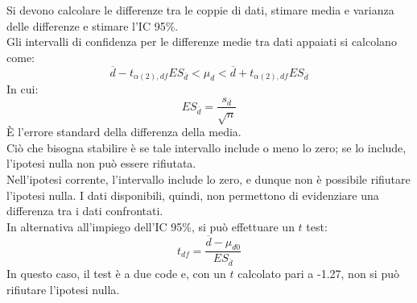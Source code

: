 \documentclass[10pt, draft]{book}
\newcounter{example}[section]
\begin{document}
\begin{example}
\begin{figure}[H]
        \caption{\small{}}
    \end{figure}
    Si devono calcolare le differenze tra le coppie di dati, stimare media e varianza delle differenze e stimare l'IC 95\%.
    \\
    Gli intervalli di confidenza per le differenze medie tra dati appaiati si calcolano come:
    \begin{equation}
        \overline{d}-t_{\alpha(2),df}ES_{\overline{d}}<\mu_d<\overline{d}+t_{\alpha(2),df}ES_{\overline{d}}
    \end{equation}
    In cui:
    \begin{equation}
        ES_{\overline{d}} = \frac{s_{\overline{d}}}{\sqrt{n}}
    \end{equation}
    È l'errore standard della differenza della media.
    \\
    Ciò che bisogna stabilire è se tale intervallo include o meno lo zero; se lo include, l'ipotesi nulla non può essere rifiutata.
    \\
    Nell'ipotesi corrente, l'intervallo include lo zero, e dunque non è possibile rifiutare l'ipotesi nulla. I dati disponibili, quindi, non permettono di evidenziare una differenza tra i dati confrontati.
    \\
    In alternativa all'impiego dell'IC 95\%, si può effettuare un $t$ test:
    \begin{equation}
        t_{df} = \frac{\overline{d}-\mu_{d0}}{ES_{\overline{d}}}
    \end{equation}
    In questo caso, il test è a due code e, con un $t$ calcolato pari a -1.27, non si può rifiutare l'ipotesi nulla.
\end{example}
\end{document}
